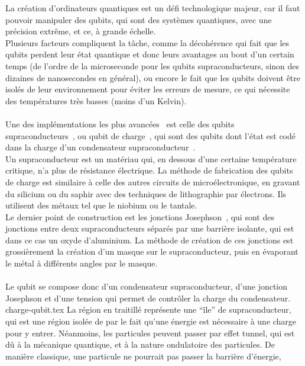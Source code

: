 La création d'ordinateurs quantiques est un défi technologique majeur, car il faut
pouvoir manipuler des qubits, qui sont des systèmes quantiques, avec une précision
extrême, et ce, à grande échelle.\\
Plusieurs facteurs compliquent la tâche, comme la décohérence qui fait que les
qubits perdent leur état quantique et donc leurs avantages au bout d'un
certain temps (de l'ordre de la microseconde pour les qubits supraconducteurs, sinon
des dizaines de nanosecondes en général), ou encore le fait que les qubits doivent
être isolés de leur environnement pour éviter les erreurs de mesure, ce qui
nécessite des températures très basses (moins d'un Kelvin).\\ \\
Une des implémentations les plus avancées~\cite{wiki:ibm-quantum} est celle des qubits supraconducteurs~\cite{wiki:superconducting-qc},
ou qubit de charge~\cite{wiki:charge-qbit}, qui sont des qubits dont l'état est codé dans la charge d'un
condensateur supraconducteur~\cite{wiki:transmon,wiki:trapped-ion}.\\
Un supraconducteur est un matériau qui, en dessous d'une certaine température
critique, n'a plus de résistance électrique.
La méthode de fabrication des qubits de charge est similaire à celle des autres
circuits de microélectronique, en gravant du silicium ou du saphir avec des
techniques de lithographie par électrons.
Ils utilisent des métaux tel que le niobium ou le tantale.\\
Le dernier point de construction est les jonctions Josephson~\cite{wiki:josephson-effect}, qui sont des
jonctions entre deux supraconducteurs séparés par une barrière isolante, qui
est dans ce cas un oxyde d'aluminium.
La méthode de création de ces jonctions est grossièrement la création d'un masque
sur le supraconducteur, puis en évaporant le métal à différents angles par le masque.\\ \\
Le qubit se compose donc d'un condensateur supraconducteur, d'une jonction Josephson
et d'une tension qui permet de contrôler la charge du condensateur.
{charge-qubit.tex}
La région en traitillé représente une ``île'' de supraconducteur, qui est
une région isolée de par le fait qu'une énergie est nécessaire à une charge
pour y entrer.
Néanmoins, les particules peuvent passer par effet tunnel, qui est dû à la
mécanique quantique, et à la nature ondulatoire des particules.
De manière classique, une particule ne pourrait pas passer la barrière d'énergie,
